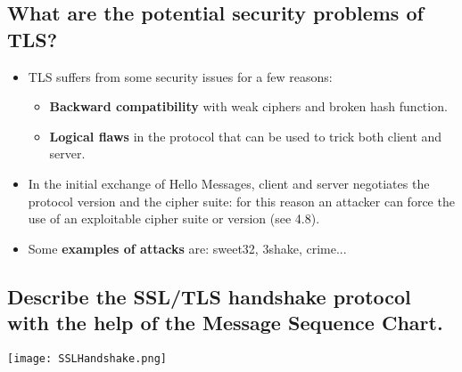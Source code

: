 \documentclass[9pt, letterpaper]{article}
\begin{document}
\subsection{What are the potential security problems of TLS?}
\begin{itemize}
	\item TLS suffers from some security issues for a few reasons:
	      \begin{itemize}
		      \item \textbf{Backward compatibility} with weak ciphers and broken hash function.
		      \item \textbf{Logical flaws} in the protocol that can be used to trick both client and server.
	      \end{itemize}
	\item In the initial exchange of Hello Messages, client and server negotiates the protocol version and the cipher suite: for this reason an attacker can force the use of an exploitable cipher suite or version (see 4.8).
	\item Some \textbf{examples of attacks} are: sweet32, 3shake, crime...
\end{itemize}

\subsection{Describe the SSL/TLS handshake protocol with the help of the Message Sequence Chart.}
\begin{center}
	\texttt{[image: SSLHandshake.png]}
\end{center}
\end{document}
